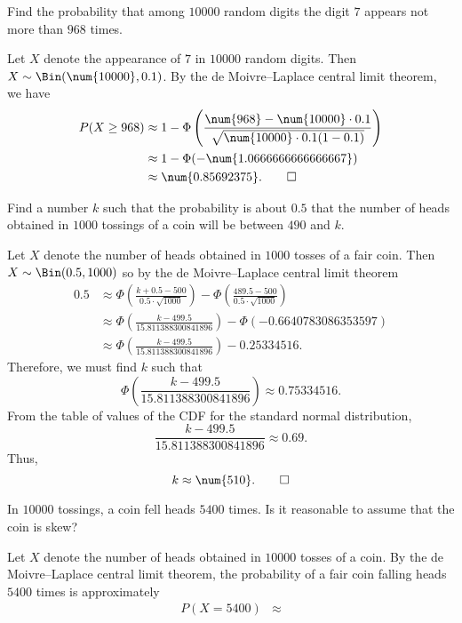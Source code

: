 \begin{problem}[Handout 14, \# 11]
  Find the probability that among \(\num{10000}\) random digits the digit
  \(7\) appears not more than \(968\) times.
\end{problem}
\begin{solution}
  Let \(X\) denote the appearance of \(7\) in \(\num{10000}\) random
  digits. Then \(X\sim\Bin(\num{10000},0.1)\). By the de Moivre--Laplace
  central limit theorem, we have
  \begin{align*}
    P(X\geq 968)
    &\approx 1-\Phi\left(\frac{\num{968}-\num{10000}\cdot 0.1}
      {\sqrt{\num{10000}\cdot 0.1(1-0.1)}}\right)\\
    &\approx 1-\Phi(-\num{1.0666666666666667})\\
    &\approx\num{0.85692375}.\qedhere
  \end{align*}
\end{solution}
\newpage

\begin{problem}[Handout 14, \# 12]
  Find a number \(k\) such that the probability is about \(0.5\) that the
  number of heads obtained in \(\num{1000}\) tossings of a coin will be
  between \(490\) and \(k\).
\end{problem}
\begin{solution}
  Let \(X\) denote the number of heads obtained in \(1000\) tosses of a
  fair coin. Then \(X\sim\Bin(0.5,1000)\) so by the de Moivre--Laplace
  central limit theorem
  \begin{align*}
    0.5&\approx\Phi\left(\frac{k+0.5-500}{0.5\cdot \sqrt{1000}}\right)
         -\Phi\left(\frac{489.5-500}{0.5\cdot\sqrt{1000}}\right)\\
       &\approx\Phi\left(\frac{k-499.5}{\num{15.811388300841896}}\right)
         -\Phi(-\num{0.6640783086353597})\\
       &\approx\Phi\left(\frac{k-499.5}{\num{15.811388300841896}}\right)
         -\num{0.25334516}.
  \end{align*}
  Therefore, we must find \(k\) such that
  \[
    \Phi\left(\frac{k-499.5}{\num{15.811388300841896}}\right)\approx
    \num{0.75334516}.
  \]
  From the table of values of the CDF for the standard normal distribution,
  \[
    \frac{k-499.5}{\num{15.811388300841896}}\approx 0.69.
  \]
  Thus,
  \[
    k\approx\num{510}.\qedhere
  \]
\end{solution}
\newpage

\begin{problem}[Handout 14, \# 13]
  In \(\num{10000}\) tossings, a coin fell heads \(\num{5400}\) times. Is
  it reasonable to assume that the coin is skew?
\end{problem}
\begin{solution}
  Let \(X\) denote the number of heads obtained in \(\num{10000}\) tosses
  of a coin. By the de Moivre--Laplace central limit theorem, the
  probability of a fair coin falling heads \(\num{5400}\) times is
  approximately
  \begin{align*}
    P(X=\num{5400})
    &\approx
  \end{align*}
\end{solution}
\newpage

